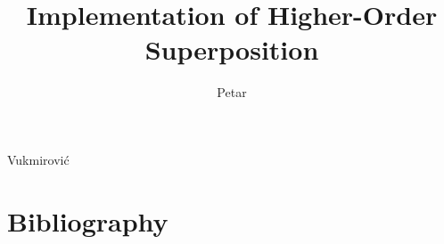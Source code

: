 \documentclass[print]{dissertation}
\begin{document}


\title{Implementation of Higher-Order Superposition}
\author{Petar}{Vukmirović}

\frontmatter



\tableofcontents




\mainmatter

\thumbtrue












%

\thumbfalse

\chapter*{Bibliography}







% 
\end{document}
